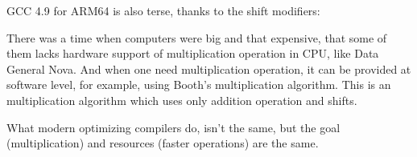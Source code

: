 



GCC 4.9 for ARM64 is also terse, thanks to the shift modifiers:




There was a time when computers were big and that expensive, that some of them lacks hardware support of multiplication
operation in \ac{CPU}, like Data General Nova.
And when one need multiplication operation, it can be provided at software level, for example, using Booth's multiplication
algorithm.
This is an multiplication algorithm which uses only addition operation and shifts.

What modern optimizing compilers do, isn't the same,
but the goal (multiplication) and resources (faster operations) are the same.

